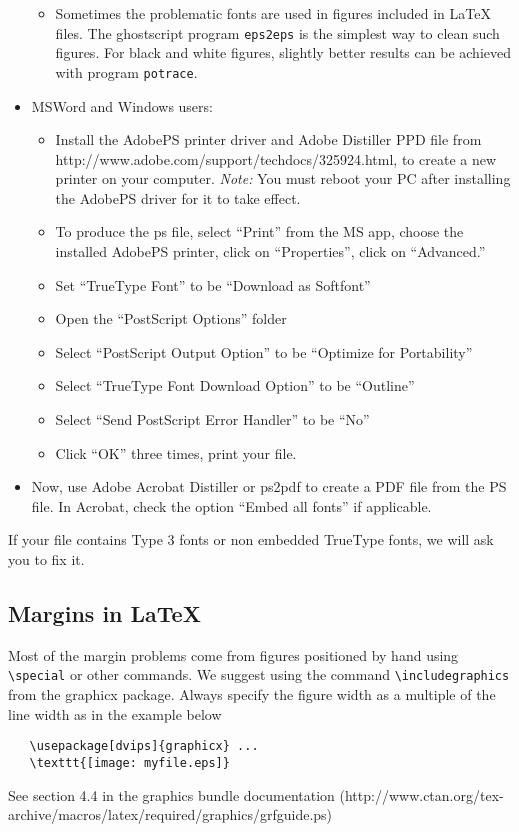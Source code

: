 \documentclass{article}
\theoremstyle{plain}
\begin{document}
\begin{itemize}
\begin{itemize}
\item Sometimes the problematic fonts are used in figures
included in LaTeX files. The ghostscript program \verb+eps2eps+ is the simplest
way to clean such figures. For black and white figures, slightly better
results can be achieved with program \verb+potrace+.
\end{itemize}
\item MSWord and Windows users:
\begin{itemize}
\item Install the AdobePS printer driver and Adobe Distiller PPD file from
http://www.adobe.com/support/techdocs/325924.html, to create a new printer
on your computer. {\it Note:} You must reboot your PC after installing the
AdobePS driver for it to take effect.
\item To produce the ps file, select ``Print'' from the MS app, choose
the installed AdobePS printer, click on ``Properties'', click on ``Advanced.''
\item Set ``TrueType Font'' to be ``Download as Softfont''
\item Open the ``PostScript Options'' folder
\item Select ``PostScript Output Option'' to be ``Optimize for Portability''
\item Select ``TrueType Font Download Option'' to be ``Outline''
\item Select ``Send PostScript Error Handler'' to be ``No''
\item Click ``OK'' three times, print your file.
\end{itemize}
\item Now, use Adobe Acrobat Distiller or ps2pdf to create a PDF file from
the PS file. In Acrobat, check the option ``Embed all fonts'' if
applicable.

\end{itemize}
If your file contains Type 3 fonts or non embedded TrueType fonts, we will
ask you to fix it. 

\subsection{Margins in LaTeX}
 
Most of the margin problems come from figures positioned by hand using
\verb+\special+ or other commands. We suggest using the command
\verb+\includegraphics+
from the graphicx package. Always specify the figure width as a multiple of
the line width as in the example below
\begin{verbatim}
   \usepackage[dvips]{graphicx} ... 
   \texttt{[image: myfile.eps]} 
\end{verbatim}
See section 4.4 in the graphics bundle documentation (http://www.ctan.org/tex-archive/macros/latex/required/graphics/grfguide.ps) 
 
\end{document}
